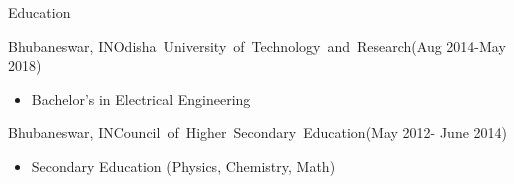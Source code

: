 \documentclass[]{mcdowellcv}
\begin{document}
    \begin{cvsection}{Education}
        \begin{cvsubsection}{Bhubaneswar, IN}{\mbox{Odisha University of Technology and Research}}{(Aug 2014-May 2018)}
            \begin{itemize}
                \item Bachelor's in  Electrical Engineering
            \end{itemize}
        \end{cvsubsection}
        \begin{cvsubsection}{Bhubaneswar, IN}{\mbox{Council of Higher Secondary Education}}{(May 2012- June 2014)}
            \begin{itemize}
                \item Secondary Education (Physics, Chemistry, Math)
            \end{itemize}
        \end{cvsubsection}
    \end{cvsection}
\end{document}
